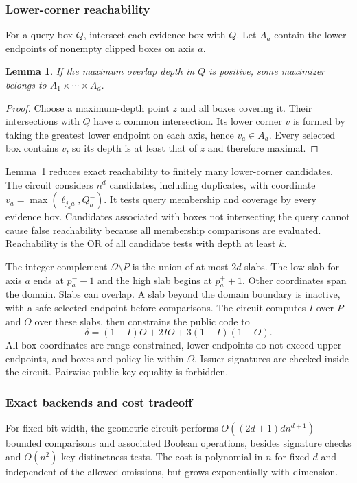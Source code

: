 \documentclass[preprint,review,12pt]{elsarticle}
\newtheorem{lemma}{Lemma}
\begin{document}
\subsubsection{Lower-corner reachability}
For a query box $Q$, intersect each evidence box with $Q$. Let $A_a$ contain the lower endpoints of nonempty clipped boxes on axis $a$.
\begin{lemma}\label{lem:corner}
If the maximum overlap depth in $Q$ is positive, some maximizer belongs to $A_1\times\cdots\times A_d$.
\end{lemma}
\begin{proof}
Choose a maximum-depth point $z$ and all boxes covering it. Their intersections with $Q$ have a common intersection. Its lower corner $v$ is formed by taking the greatest lower endpoint on each axis, hence $v_a\in A_a$. Every selected box contains $v$, so its depth is at least that of $z$ and therefore maximal.\end{proof}
Lemma~\ref{lem:corner} reduces exact reachability to finitely many lower-corner candidates. The circuit considers $n^d$ candidates, including duplicates, with coordinate $v_a=\max(\ell_{j_a a},Q^-_a)$. It tests query membership and coverage by every evidence box. Candidates associated with boxes not intersecting the query cannot cause false reachability because all membership comparisons are evaluated. Reachability is the OR of all candidate tests with depth at least $k$.

The integer complement $\Omega\setminus P$ is the union of at most $2d$ slabs. The low slab for axis $a$ ends at $p^-_a-1$ and the high slab begins at $p^+_a+1$. Other coordinates span the domain. Slabs can overlap. A slab beyond the domain boundary is inactive, with a safe selected endpoint before comparisons. The circuit computes $I$ over $P$ and $O$ over these slabs, then constrains the public code to
\begin{equation}
 \delta=(1-I)O+2IO+3(1-I)(1-O).
\end{equation}
All box coordinates are range-constrained, lower endpoints do not exceed upper endpoints, and boxes and policy lie within $\Omega$. Issuer signatures are checked inside the circuit. Pairwise public-key equality is forbidden.

\subsubsection{Exact backends and cost tradeoff}
For fixed bit width, the geometric circuit performs $O((2d+1)d n^{d+1})$ bounded comparisons and associated Boolean operations, besides signature checks and $O(n^2)$ key-distinctness tests. The cost is polynomial in $n$ for fixed $d$ and independent of the allowed omissions, but grows exponentially with dimension.
\end{document}
